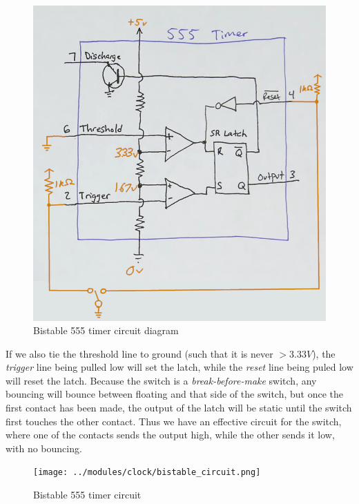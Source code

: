 \documentclass[12pt]{article}
\begin{document}
\begin{FlushLeft}
\begin{figure}[h]
  \begin{center}
    \includegraphics[width=0.8\linewidth]{../modules/clock/bistable_circuit_diagram.png}
    \caption{Bistable 555 timer circuit diagram}
    \label{fig:bistable_circuit_diagram}
  \end{center}
\end{figure}

If we also tie the threshold line to ground (such that it is never $>3.33V$), the \textit{trigger} line being pulled low will set the latch, while the \textit{reset} line being puled low will reset the latch. Because the switch is a \textit{break-before-make} switch, any bouncing will bounce between floating and that side of the switch, but once the first contact has been made, the output of the latch will be static until the switch first touches the other contact. Thus we have an effective circuit for the switch, where one of the contacts sends the output high, while the other sends it low, with no bouncing. \\

\begin{figure}[h]
  \begin{center}
    \texttt{[image: ../modules/clock/bistable\_circuit.png]}
    \caption{Bistable 555 timer circuit}
    \label{fig:bistable_circuit}
  \end{center}
\end{figure}


\end{FlushLeft}
\end{document}
